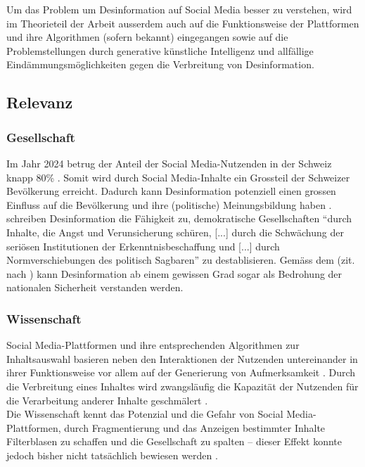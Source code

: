 \documentclass[12pt,a4paper]{article}        %
\begin{document}
Um das Problem um Desinformation auf Social Media besser zu verstehen, wird im Theorieteil der Arbeit ausserdem auch auf die Funktionsweise der Plattformen und ihre Algorithmen (sofern bekannt) eingegangen sowie auf die Problemstellungen durch generative künstliche Intelligenz und allfällige Eindämmungsmöglichkeiten gegen die Verbreitung von Desinformation.

\subsection{Relevanz}

\subsubsection{Gesellschaft}
Im Jahr 2024 betrug der Anteil der Social Media-Nutzenden in der Schweiz knapp 80\% \parencite[22]{we_are_social_anteil_2024}. Somit wird durch Social Media-Inhalte ein Grossteil der Schweizer Bevölkerung erreicht. Dadurch kann Desinformation potenziell einen grossen Einfluss auf die Bevölkerung und ihre (politische) Meinungsbildung haben \parencites[18]{grujic_warnhinweise_2024}[258]{hohlfeld_schlechte_2020}[1]{khan_fake_2021}. \\
\textcite[258]{hohlfeld_schlechte_2020} schreiben Desinformation die Fähigkeit zu, demokratische Gesellschaften “durch Inhalte, die Angst und Verunsicherung schüren, [...] durch die Schwächung der seriösen Institutionen der Erkenntnisbeschaffung und [...] durch Normverschiebungen des politisch Sagbaren” zu destablisieren. Gemäss dem \textcite{bundesministerium_des_innern_und_fur_heimat_desinformation_2022} (zit. nach \textcite[15]{teetz_Social Media-post_2023}) kann Desinformation ab einem gewissen Grad sogar als Bedrohung der nationalen Sicherheit verstanden werden.

\subsubsection{Wissenschaft}
Social Media-Plattformen und ihre entsprechenden Algorithmen zur Inhaltsauswahl basieren neben den Interaktionen der Nutzenden untereinander in ihrer Funktionsweise vor allem auf der Generierung von Aufmerksamkeit \parencites[vgl.][220]{schmidt_meinungsbildung_2022}[493]{behnke_manipulation_2018}. Durch die Verbreitung eines Inhaltes wird zwangsläufig die Kapazität der Nutzenden für die Verarbeitung anderer Inhalte geschmälert \parencite[248]{hohlfeld_schlechte_2020}. \\
Die Wissenschaft kennt das Potenzial und die Gefahr von Social Media-Plattformen, durch Fragmentierung und das Anzeigen bestimmter Inhalte Filterblasen zu schaffen und die Gesellschaft zu spalten – dieser Effekt konnte jedoch bisher nicht tatsächlich bewiesen werden \parencite[220]{schmidt_meinungsbildung_2022}.\\
\end{document}
